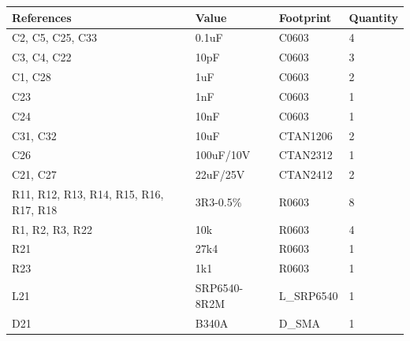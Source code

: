 \documentclass[12pt, a4paper]{article}
\begin{document}
\begin{longtable}{|p{5cm}|p{5cm}|p{5cm}|p{1.7cm}|}
\hline
\textbf{References} & \textbf{Value} & \textbf{Footprint} & \textbf{Quantity}\\ \hline
C2, C5, C25, C33                       & 0.1uF                   & C0603                                      & 4        \\ \hline
C3, C4, C22                            & 10pF                    & C0603                                      & 3        \\ \hline
C1, C28                                & 1uF                     & C0603                                      & 2        \\ \hline
C23                                    & 1nF                     & C0603                                      & 1        \\ \hline
C24                                    & 10nF                    & C0603                                      & 1        \\ \hline
C31, C32                               & 10uF                    & CTAN1206                                   & 2        \\ \hline
C26                                    & 100uF/10V               & CTAN2312                                   & 1        \\ \hline
C21, C27                               & 22uF/25V                & CTAN2412                                   & 2        \\ \hline
R11, R12, R13, R14, R15, R16, R17, R18 & 3R3-0.5\%               & R0603                                      & 8        \\ \hline
R1, R2, R3, R22                        & 10k                     & R0603                                      & 4        \\ \hline
R21                                    & 27k4                    & R0603                                      & 1        \\ \hline
R23                                    & 1k1                     & R0603                                      & 1        \\ \hline
L21                                    & SRP6540-8R2M            & L\_SRP6540                                 & 1        \\ \hline
D21                                    & B340A                   & D\_SMA                                     & 1        \\ \hline

\end{longtable}
\end{document}
